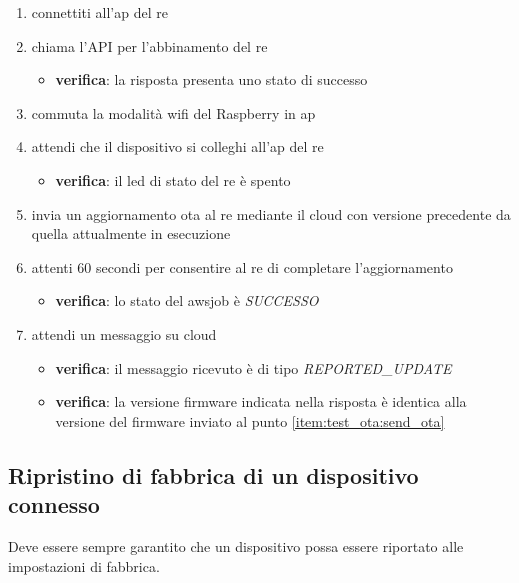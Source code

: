 \documentclass[12pt,a4paper,twoside,titlepage]{book}
\begin{document}
\begin{enumerate}
    \item connettiti all'\acrshort{ap} del \acrshort{re}
    \item chiama l'API per l'abbinamento del \acrshort{re} 
    \begin{itemize}
        \item \textbf{verifica}: la risposta presenta uno stato di successo 
    \end{itemize}
    \item commuta la modalità \Gls{wifi} del Raspberry in \acrshort{ap}
    \item attendi che il dispositivo si colleghi all'\acrshort{ap} del \acrshort{re}
    \begin{itemize}
        \item \textbf{verifica}: il  \acrshort{led} di stato del \acrshort{re} è spento 
    \end{itemize}
    \item invia un aggiornamento \acrshort{ota} al \acrshort{re} mediante il \gls{cloud} con versione 
        precedente da quella attualmente in esecuzione \label{item:test_ota:send_ota}
    \item attenti 60 secondi per consentire al \acrshort{re} di completare l'aggiornamento
    \begin{itemize}
        \item \textbf{verifica}: lo stato del \gls{awsjob} è \textit{SUCCESSO}
    \end{itemize}
    \item attendi un messaggio su cloud
    \begin{itemize}
        \item \textbf{verifica}: il messaggio ricevuto è di tipo \textit{REPORTED\_UPDATE}
        \item \textbf{verifica}: la versione \gls{firmware} indicata nella risposta è identica alla 
            versione del \gls{firmware} inviato al punto \autoref{item:test_ota:send_ota}
    \end{itemize}
\end{enumerate}

\subsection{Ripristino di fabbrica di un dispositivo connesso}
\label{section:test_factory_reset}

Deve essere sempre garantito che un dispositivo possa essere riportato alle impostazioni di fabbrica.
\end{document}
